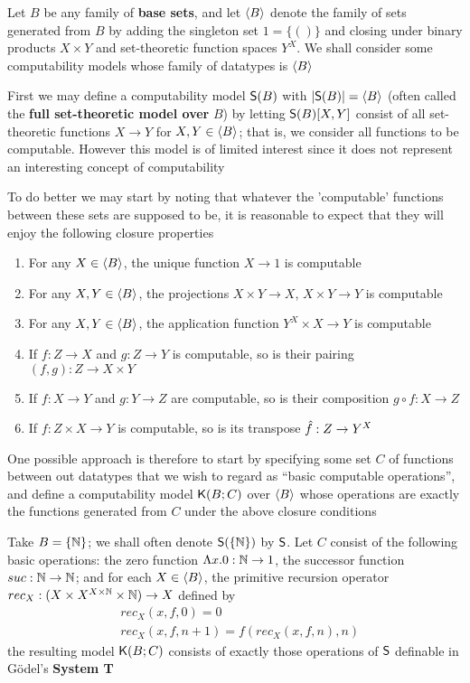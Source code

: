 \documentclass[11pt]{article}
\begin{document}
\begin{examplle}[]
\label{3.1.7}
Let \(B\) be any family of \textbf{base sets}, and let \(\langle B\rangle\) denote the family of sets generated
from \(B\) by adding the singleton set \(1=\{()\}\) and closing under binary products \(X\times Y\) and
set-theoretic function spaces \(Y^X\). We shall consider some computability models whose family
of datatypes is \(\langle B\rangle\)

First we may define a computability model \(\textsf{S}(B)\) with \(\abs{\sfS(B)}=\la B\ra\) (often called
the \textbf{full set-theoretic model over} \(B\)) by letting \(\textsf{S}(B)[X,Y]\) consist of all
set-theoretic functions \(X\to Y\) for \(X,Y\in\langle B\rangle\); that is, we consider all functions to be
computable. However this model is of limited interest since it does not represent an interesting
concept of computability

To do better we may start by noting that whatever the 'computable' functions between these sets
are supposed to be, it is reasonable to expect that they will enjoy the following closure
properties
\begin{enumerate}
\item For any \(X\in\langle B\rangle\), the unique function \(X\to 1\) is computable
\item For any \(X,Y\in\langle B\rangle\), the projections \(X\times Y\to X\), \(X\times Y\to Y\) is computable
\item For any \(X,Y\in\langle B\rangle\), the application function \(Y^X\times X\to Y\) is computable
\item If \(f:Z\to X\) and \(g:Z\to Y\) is computable, so is their pairing \((f,g):Z\to X\times Y\)
\item If \(f:X\to Y\) and \(g:Y\to Z\) are computable, so is their composition \(g\circ f:X\to Z\)
\item If \(f:Z\times X\to Y\) is computable, so is its transpose \(\hat{f}:Z\to Y^X\)
\end{enumerate}


One possible approach is therefore to start by specifying some set \(C\) of functions between
out datatypes that we wish to regard as ``basic computable operations'', and define a
computability model \(\textsf{K}(B;C)\) over \(\langle B\rangle\) whose operations are exactly the functions
generated from \(C\) under the above closure conditions

Take \(B=\{\mathbb{N}\}\); we shall often denote \(\textsf{S}(\{\mathbb{N}\})\) by \(\textsf{S}\). Let \(C\) consist of the
following basic operations: the zero function \(\Lambda x.0:\mathbb{N}\to 1\), the successor function \(suc:\mathbb{N}\to\mathbb{N}\);
and for each \(X\in\langle B\rangle\), the primitive recursion operator \(rec_X:(X\times X^{X\times\mathbb{N}}\times\mathbb{N})\to X\) defined by
\begin{align*}
&rec_X(x,f,0)=0\\
&rec_X(x,f,n+1)=f(rec_X(x,f,n),n)
\end{align*}
the resulting model \(\textsf{K}(B;C)\) consists of exactly those operations of \(\textsf{S}\) definable in
Gödel's \textbf{System T}
\end{examplle}
\end{document}
